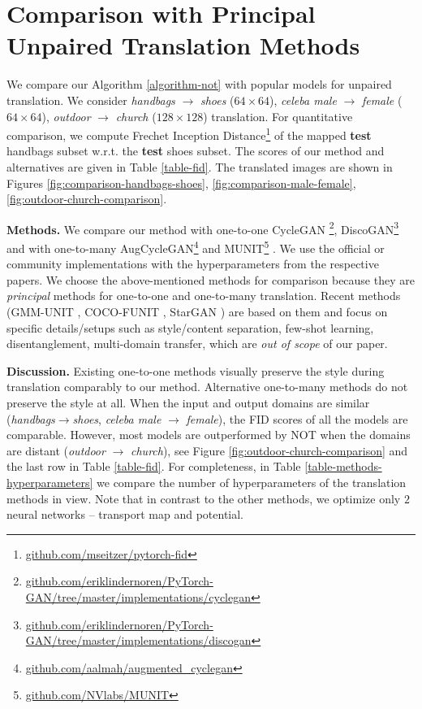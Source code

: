 \documentclass{article} %
\begin{document}
\section{Comparison with Principal Unpaired Translation Methods}
\label{sec-exp-comparison}

We compare our Algorithm \ref{algorithm-not} with popular models for unpaired translation. We consider \textit{handbags} $\rightarrow$ \textit{shoes} ($64\times 64$), \textit{celeba male} $\rightarrow$ \textit{female} ($64\times 64$), \textit{outdoor} $\rightarrow$ \textit{church} ($128\times 128$) translation. For quantitative comparison, we compute Frechet Inception Distance\footnote{\url{github.com/mseitzer/pytorch-fid}} \citep[FID]{heusel2017gans} of the mapped \textbf{test} handbags subset w.r.t. the \textbf{test} shoes subset. The scores of our method and alternatives are given in Table \ref{table-fid}. The translated images are shown in Figures \ref{fig:comparison-handbags-shoes}, \ref{fig:comparison-male-female}, \ref{fig:outdoor-church-comparison}.

\textbf{Methods.} We compare our method with one-to-one CycleGAN \footnote{\url{github.com/eriklindernoren/PyTorch-GAN/tree/master/implementations/cyclegan}}\citep{zhu2017unpaired}, DiscoGAN\footnote{\url{github.com/eriklindernoren/PyTorch-GAN/tree/master/implementations/discogan}} \citep{kim2017learning} and with one-to-many AugCycleGAN\footnote{\url{github.com/aalmah/augmented_cyclegan}} \citep{almahairi2018augmented} and MUNIT\footnote{\url{github.com/NVlabs/MUNIT}} \citep{huang2018multimodal}. We use the official or community implementations with the hyperparameters from the respective papers. We choose the above-mentioned methods for comparison because they are \textit{principal} methods for one-to-one and one-to-many translation. Recent methods (GMM-UNIT \citep{liu2020gmm}, COCO-FUNIT \citep{saito2020coco}, StarGAN \citep{choi2020stargan}) are based on them and focus on specific details/setups such as style/content separation, few-shot learning, disentanglement, multi-domain transfer, which are \textit{out of scope} of our paper. 


\textbf{Discussion.} Existing one-to-one methods visually preserve the style during translation comparably to our method. Alternative one-to-many methods do not preserve the style at all. When the input and output domains are similar (\textit{handbags}$\rightarrow$\textit{shoes}, \textit{celeba male} $\rightarrow$ \textit{female}), the FID scores of all the models are comparable. However, most models are outperformed by NOT when the domains are distant (\textit{outdoor} $\rightarrow$ \textit{church}), see Figure \ref{fig:outdoor-church-comparison} and the last row in Table \ref{table-fid}. For completeness, in Table \ref{table-methods-hyperparameters} we compare the number of hyperparameters of the translation methods in view. Note that in contrast to the other methods, we optimize only $2$ neural networks -- transport map and potential.\let\thefootnote\relax{}
\end{document}
